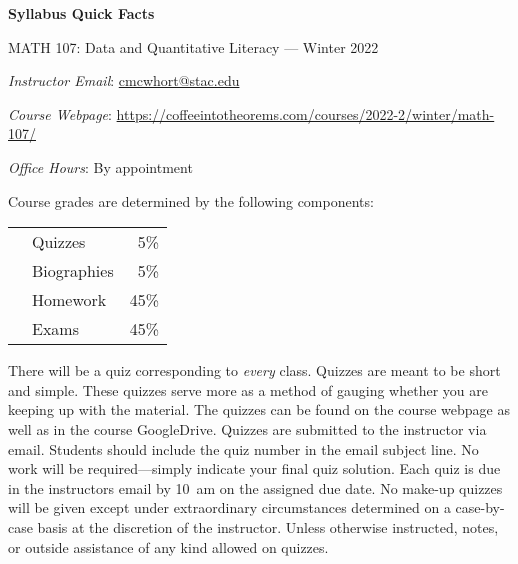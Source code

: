 \documentclass[11pt,letterpaper]{article}
\begin{document}
\begin{center} 
\bfseries
\color{stacred}
\LARGE Syllabus Quick Facts \par\vspace{0.2\baselineskip}
\Large MATH 107: Data and Quantitative Literacy --- Winter 2022
\end{center} \pspace


\hspace{0.53cm} {\itshape Instructor Email}: \href{mailto:cmcwhort@stac.edu}{cmcwhort@stac.edu} \par
\hspace{0.53cm} {\itshape Course Webpage}: \href{https://coffeeintotheorems.com/courses/2022-2/winter/math-107/}{https://coffeeintotheorems.com/courses/2022-2/winter/math-107/} \par
\hspace{0.53cm} {\itshape Office Hours}: By appointment \pspace


Course grades are determined by the following components: \par \vspace{-0.3cm}
	\begin{table}[!ht]
        \begin{tabular}{clr}
	& Quizzes & 5\% \\
	& Biographies & 5\% \\
	& Homework & 45\% \\
	& Exams & 45\%
        \end{tabular} 
        \end{table}


There will be a quiz corresponding to \textit{every} class. Quizzes are meant to be short and simple. These quizzes serve more as a method of gauging whether you are keeping up with the material. The quizzes can be found on the course webpage as well as in the course GoogleDrive. Quizzes are submitted to the instructor via email. Students should include the quiz number in the email subject line. No work will be required---simply indicate your final quiz solution. Each quiz is due in the instructors email by 10~am on the assigned due date. No make-up quizzes will be given except under extraordinary circumstances determined on a case-by-case basis at the discretion of the instructor. Unless otherwise instructed, notes, or outside assistance of any kind allowed on quizzes. \pspace
\end{document}
